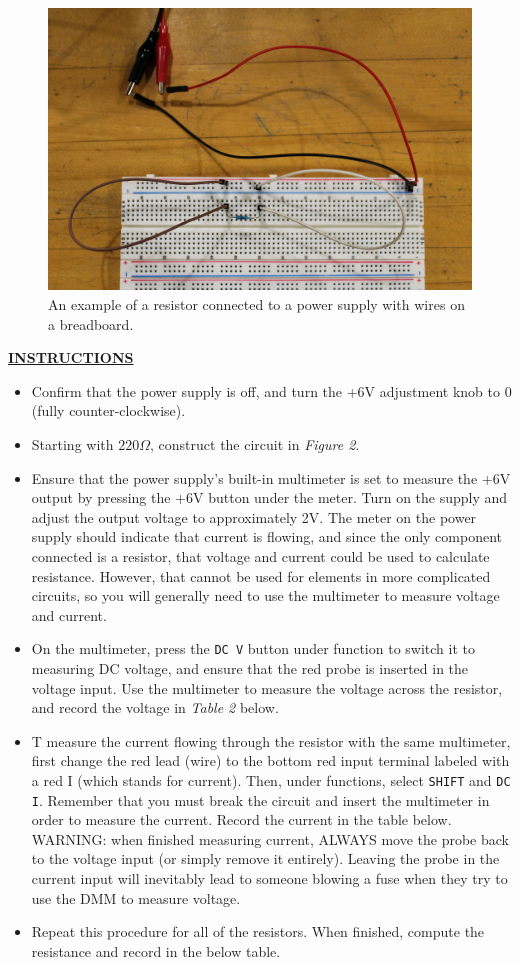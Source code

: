 \documentclass[12pt]{article}
\begin{document}
\begin{figure}[H]
    \centering
    \includegraphics[width=12cm]{photos/lab/resistorcircuit.jpg}
    \caption{An example of a resistor connected to a power supply with wires on a breadboard.}
\end{figure}

\textbf{\underline{INSTRUCTIONS}}
\begin{itemize}
    \item Confirm that the power supply is off, and turn the +6V adjustment knob to 0 (fully counter-clockwise).
    \item Starting with $220\Omega$, construct the circuit in \textit{Figure 2}.
    \item Ensure that the power supply's built-in multimeter is set to measure the +6V output by pressing the +6V button under the meter. Turn on the supply and adjust the output voltage to approximately 2V.  The meter on the power supply should indicate that current is flowing, and since the only component connected is a resistor, that voltage and current could be used to calculate resistance.  However, that cannot be used for elements in more complicated circuits, so you will generally need to use the multimeter to measure voltage and current.
    \item On the multimeter, press the \texttt{DC V} button under function to switch it to measuring DC voltage, and ensure that the red probe is inserted in the voltage input.  Use the multimeter to measure the voltage across the resistor, and record the voltage in \textit{Table 2} below.
    \item T measure the current flowing through the resistor with the same multimeter, first change the red lead (wire) to the bottom red input terminal labeled with a red I (which stands for current). Then, under functions, select \texttt{SHIFT} and \texttt{DC I}. Remember that you must break the circuit and insert the multimeter in order to measure the current. Record the current in the table below.  WARNING: when finished measuring current, ALWAYS move the probe back to the voltage input (or simply remove it entirely).  Leaving the probe in the current input will inevitably lead to someone blowing a fuse when they try to use the DMM to measure voltage.
    \item Repeat this procedure for all of the resistors. When finished, compute the resistance and record in the below table.
\end{itemize}
\end{document}
